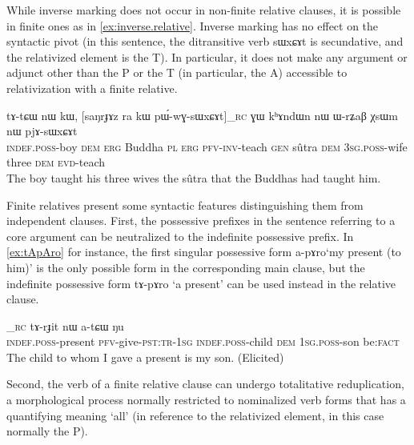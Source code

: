 \documentclass[oldfontcommands,oneside,a4paper,11pt]{article}
\newcommand{\ipa}[1]{{\phon#1}} %
\newcommand{\topic}{\textsc{dem}}
\begin{document}
While inverse marking does not occur in non-finite relative clauses, it is possible in finite ones as in \ref{ex:inverse.relative}. Inverse marking has no effect on the syntactic pivot (in this sentence, the ditransitive verb \ipa{sɯxɕɤt} is secundative, and the relativized element is the T). In particular, it does not make any argument or adjunct other than the P or the T (in particular, the A) accessible to relativization with a finite relative.

     \begin{exe}
   \ex \label{ex:inverse.relative}
 \gll
\ipa{tɤ-tɕɯ}  	\ipa{nɯ}  	\ipa{kɯ,}  	[\ipa{saŋrɟɤz}  	\ipa{ra}  	\ipa{kɯ}  	\ipa{pɯ́-wɣ-sɯxɕɤt}]_{\textsc{rc}}  	\ipa{ɣɯ}  	\ipa{kʰɤndɯn}  	\ipa{nɯ}  	\ipa{ɯ-rʑaβ}  	\ipa{χsɯm}  	\ipa{nɯ}  	\ipa{pjɤ-sɯxɕɤt}  \\
\textsc{indef.poss}-boy \textsc{dem} \textsc{erg} Buddha \textsc{pl} \textsc{erg} \textsc{pfv-inv}-teach   \textsc{gen} sûtra \textsc{dem} \textsc{3sg.poss}-wife three \textsc{dem} \textsc{evd}-teach \\
\glt The boy taught his three wives the sûtra that the Buddhas had taught him.
\end{exe}


Finite relatives present some syntactic features distinguishing them from independent clauses. First, the possessive prefixes in the sentence referring to a core argument can be neutralized to the indefinite possessive prefix. In \ref{ex:tApAro} for instance, the first singular possessive form \ipa{a-pɤro}`my present (to him)' is the only possible form in the corresponding main clause, but the indefinite possessive form \ipa{tɤ-pɤro} `a present' can be used instead in the relative clause.

		\begin{exe}
\ex \label{ex:tApAro}
\gll
	[\ipa{tɤ-pɤro}  	\ipa{nɯ-mbi-t-a}]_{\textsc{rc}}  	\ipa{tɤ-rɟit}  	\ipa{nɯ}  	\ipa{a-tɕɯ}  	\ipa{ŋu}   \\
	\textsc{indef.poss}-present \textsc{pfv}-give-\textsc{pst:tr-1sg} 	\textsc{indef.poss}-child \topic{} \textsc{1sg.poss}-son be:\textsc{fact} \\
\glt The child to whom I gave a present is my son. (Elicited)
 	  \end{exe} 
 	  
Second, the verb of a finite relative clause can undergo totalitative reduplication, a morphological process normally restricted to nominalized verb forms that has a quantifying meaning `all' (in reference to the relativized element, in this case normally the P).
\end{document}

